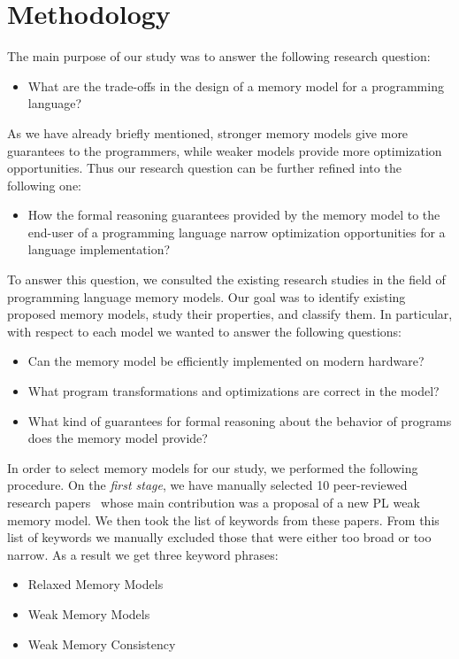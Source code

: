 \section{Methodology}
\label{sec:methodology}

The main purpose of our study was to answer the following research question:

\begin{itemize}
  \item What are the trade-offs in the design of a memory model for a programming language?
\end{itemize}

As we have already briefly mentioned, stronger memory models 
give more guarantees to the programmers, while weaker models 
provide more optimization opportunities. 
Thus our research question can be further refined into the following one:

\begin{itemize}
  \item How the formal reasoning guarantees provided by the memory model 
    to the end-user of a programming language narrow  
    optimization opportunities for a language implementation?
\end{itemize}

To answer this question, we consulted the existing research studies 
in the field of programming language memory models.
Our goal was to identify existing proposed memory models, 
study their properties, and classify them.
In particular, with respect to each model we wanted to answer the following questions:

\begin{itemize}
  
  \item Can the memory model be efficiently implemented on modern hardware? 

  \item What program transformations and optimizations are correct in the model? 

  \item What kind of guarantees for formal reasoning about the behavior 
    of programs does the memory model provide?
  
\end{itemize}

In order to select memory models for our study, we performed the following procedure.
On the \emph{first stage}, we have manually selected 10  
peer-reviewed research papers~\cite{
Manson-al:POPL05,
Batty-al:POPL11,
Lahav-al:PLDI17,
Dolan-al:PLDI18,
Watt-al:PLDI2020,
Jeffrey-Riely:LICS16,
PichonPharabod-Sewell:POPL16,
Kang-al:POPL17,
Chakraborty-Vafeiadis:POPL19,
Paviotti-al:ESOP20
} 
whose main contribution was a proposal of a new PL weak memory model.
We then took the list of keywords from these papers. 
From this list of keywords we manually excluded those 
that were either too broad or too narrow.
As a result we get three keyword phrases:
\begin{itemize}
  \item Relaxed Memory Models
  \item Weak Memory Models
  \item Weak Memory Consistency
\end{itemize}
 
